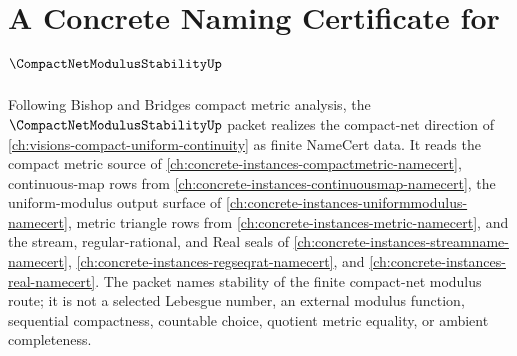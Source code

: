 \chapter{A Concrete Naming Certificate for $\CompactNetModulusStabilityUp$}
\label{ch:concrete-instances-compact-net-modulus-stability-namecert}

Following Bishop and Bridges compact metric analysis, the $\CompactNetModulusStabilityUp$ packet realizes the compact-net direction of \autoref{ch:visions-compact-uniform-continuity} as finite NameCert data. It reads the compact metric source of \autoref{ch:concrete-instances-compactmetric-namecert}, continuous-map rows from \autoref{ch:concrete-instances-continuousmap-namecert}, the uniform-modulus output surface of \autoref{ch:concrete-instances-uniformmodulus-namecert}, metric triangle rows from \autoref{ch:concrete-instances-metric-namecert}, and the stream, regular-rational, and Real seals of \autoref{ch:concrete-instances-streamname-namecert}, \autoref{ch:concrete-instances-regseqrat-namecert}, and \autoref{ch:concrete-instances-real-namecert}. The packet names stability of the finite compact-net modulus route; it is not a selected Lebesgue number, an external modulus function, sequential compactness, countable choice, quotient metric equality, or ambient completeness.

